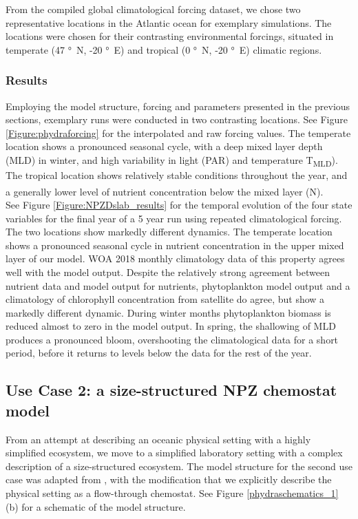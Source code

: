 \documentclass[template.tex]{subfiles}
\begin{document}
From the compiled global climatological forcing dataset, we chose two representative locations in the Atlantic ocean for exemplary simulations. The locations were chosen for their contrasting environmental forcings, situated in temperate (47 \unit{\degree N}, -20 \unit{\degree E}) and tropical (0 \unit{\degree N}, -20 \unit{\degree E}) climatic regions. 


\subsubsection{Results}
Employing the model structure, forcing and parameters presented in the previous sections, exemplary runs were conducted in two contrasting locations. 
See Figure \ref{Figure:phydraforcing} for the interpolated and raw forcing values. The temperate location shows a pronounced seasonal cycle, with a deep mixed layer depth (MLD) in winter, and high variability in light (PAR) and temperature \unit{T_{MLD}}). The tropical location shows relatively stable conditions throughout the year, and a generally lower level of nutrient concentration below the mixed layer (\unit{N^\emptyset}).\\

See Figure \ref{Figure:NPZDslab_results} for the temporal evolution of the four state variables for the final year of a 5 year run using repeated climatological forcing. 
The two locations show markedly different dynamics. The temperate location shows a pronounced seasonal cycle in nutrient concentration in the upper mixed layer of our model. WOA 2018 monthly climatology data of this property agrees well with the model output. Despite the relatively strong agreement between nutrient data and model output for nutrients, phytoplankton model output and a climatology of chlorophyll concentration from satellite do agree, but show a markedly different dynamic. During winter months phytoplankton biomass is reduced almost to zero in the model output. In spring, the shallowing of MLD produces a pronounced bloom, overshooting the climatological data for a short period, before it returns to levels below the data for the rest of the year. 





\subsection{Use Case 2: a size-structured NPZ chemostat model}
From an attempt at describing an oceanic physical setting with a highly simplified ecosystem, we move to a simplified laboratory setting with a complex description of a size-structured ecosystem. The model structure for the second use case was adapted from \cite{Banas2011b}, with the modification that we explicitly describe the physical setting as a flow-through chemostat. See Figure \ref{phydraschematics_1} (b) for a schematic of the model structure. \\
\end{document}
